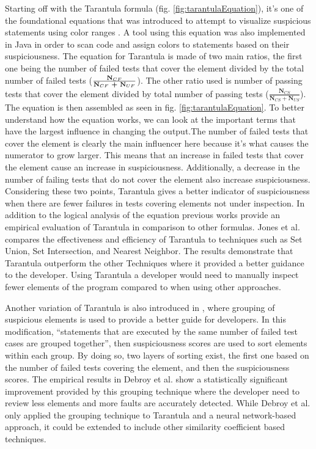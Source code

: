 Starting off with the Tarantula formula (fig. \ref{fig:tarantulaEquation}), it's
one of the foundational equations that was introduced to attempt to visualize
suspicious statements using color ranges \cite{jones2002viz,
Jones2005TarantulaEval}. A tool using this equation was also implemented in Java
in order to scan code and assign colors to statements based on their
suspiciousness. The equation for Tarantula is made of two main ratios, the first
one being the number of failed tests that cover the element divided by the total
number of failed tests (\(\frac{\textbf{N$_{CF}$}}{\textbf{N$_{CF}$ +
\textbf{N$_{UF}$}}}\)). The other ratio used is number of passing tests that
cover the element divided by total number of passing tests
(\(\frac{\textbf{N$_{CS}$}}{\textbf{N$_{CS}$}+\textbf{N$_{US}$}}\)).
The equation is then assembled as seen in fig. \ref{fig:tarantulaEquation}.
To better understand how the equation works, we can look at the important terms
that have the largest influence in changing the output.The number of failed
tests that cover the element is clearly the main influencer here because it's
what causes the numerator to grow larger. This means that an increase in failed
tests that cover the element cause an increase in suspiciousness. Additionally,
a decrease in the number of failing tests that do not cover the element also
increase suspiciousness. Considering these two points, Tarantula gives a better
indicator of suspiciousness when there are fewer failures in tests covering
elements not under inspection. In addition to the logical analysis of the
equation previous works provide an empirical evaluation of Tarantula in
comparison to other formulas. Jones et al. \cite{Jones2005TarantulaEval}
compares the effectiveness and efficiency of Tarantula to techniques such as Set Union, Set
Intersection, and Nearest Neighbor. The results demonstrate that Tarantula
outperform the other Techniques where it provided a better guidance to the
developer. Using Tarantula a developer would need to manually
inspect fewer elements of the program compared to when using other approaches.

Another variation of Tarantula is also introduced in \cite{debroy2010grouping},
where grouping of suspicious elements is used to provide a better guide for
developers. In this modification, ``statements that are executed by the same
number of failed test cases are grouped together'', then suspiciousness scores
are used to sort elements within each group. By doing so, two layers of sorting
exist, the first one based on the number of failed tests covering the element,
and then the suspiciousness scores. The empirical results in Debroy et al.
\cite{debroy2010grouping} show a statistically significant improvement provided
by this grouping technique where the developer need to review less elements and
more faults are accurately detected. While Debroy et al. only applied the
grouping technique to Tarantula and a neural network-based approach, it could be
extended to include other similarity coefficient based techniques.

